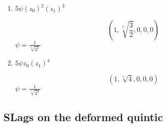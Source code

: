 \begin{enumerate}
  \item $5\psi (z_0)^2(z_1)^3$

    \begin{equation}
      (1, \sqrt[5]{\frac{3}{2}}, 0, 0, 0)
    \end{equation}
    $\psi=\frac{1}{\sqrt[5]{3^3}}$

  \item $5\psi z_0(z_1)^4$

    \begin{equation}
      (1, \sqrt[5]{4}, 0, 0, 0)
    \end{equation}
    $\psi=\frac{1}{\sqrt[5]{4^4}}$

\end{enumerate}

\subsection{SLags on the deformed quintic}


%
%
%
%
%
%
%
%
%
%
%
%
%
%
%
%
%
%

